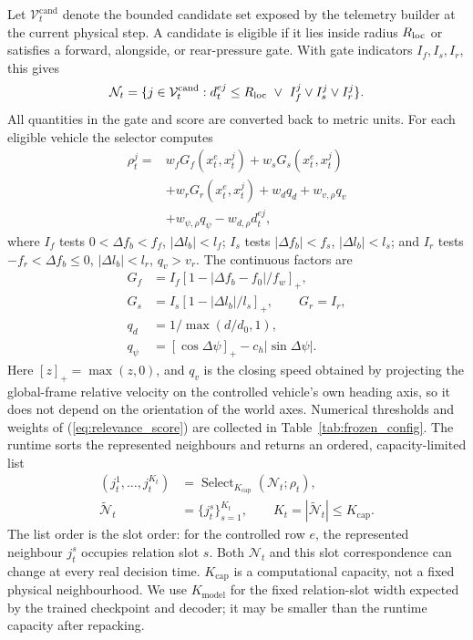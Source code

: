 \documentclass[journal]{IEEEtran}
\begin{document}
Let $\mathcal V_t^{\mathrm{cand}}$ denote the bounded candidate set exposed by
the telemetry builder at the current physical step. A candidate is eligible
if it lies inside radius $R_{\rm loc}$ or satisfies a forward, alongside, or
rear-pressure gate. With gate indicators $I_f,I_s,I_r$, this gives
\begin{equation}
\mathcal N_t=\{j\in\mathcal V_t^{\rm cand}:d_t^{ej}\le R_{\rm loc}
\ \vee\ I_f^j\vee I_s^j\vee I_r^j\}.
\end{equation}
All quantities in the gate and score are converted back to metric units.
For each eligible vehicle the selector computes
\begin{equation}
 \begin{aligned}
 \rho_t^j={}&w_f G_f(x_t^e,x_t^j)+w_s G_s(x_t^e,x_t^j)\\
 &+w_r G_r(x_t^e,x_t^j)+w_d q_d+w_{v,\rho}q_v\\
 &+w_{\psi,\rho}q_\psi-w_{d,\rho}d_t^{ej},
 \end{aligned}
\label{eq:relevance_score}
\end{equation}
where $I_f$ tests $0<\Delta f_b<f_f$, $|\Delta l_b|<l_f$;
$I_s$ tests $|\Delta f_b|<f_s$, $|\Delta l_b|<l_s$; and $I_r$ tests
$-f_r<\Delta f_b\le0$, $|\Delta l_b|<l_r$, $q_v>v_r$.
The continuous factors are
\begin{equation}
\begin{aligned}
G_f&=I_f[1-|\Delta f_b-f_0|/f_w]_+,\\
G_s&=I_s[1-|\Delta l_b|/l_s]_+,\qquad G_r=I_r,\\
q_d&=1/\max(d/d_0,1),\\
q_\psi&=[\cos\Delta\psi]_+-c_h|\sin\Delta\psi|.
\end{aligned}
\end{equation}
Here $[z]_+=\max(z,0)$, and $q_v$ is the closing speed obtained by projecting
the global-frame relative velocity on the controlled vehicle's own heading axis,
so it does not depend on the orientation of the world axes. Numerical
thresholds and weights of (\ref{eq:relevance_score}) are collected in
Table~\ref{tab:frozen_config}. The runtime sorts the
represented neighbours and returns an ordered, capacity-limited list
\begin{equation}
\begin{aligned}
 (j_t^1,\ldots,j_t^{K_t})&=\operatorname{Select}_{K_{\mathrm{cap}}}(\mathcal N_t;\rho_t),\\
 \widetilde{\mathcal N}_t&=\{j_t^s\}_{s=1}^{K_t},\qquad
 K_t=|\widetilde{\mathcal N}_t|\le K_{\mathrm{cap}}.
\end{aligned}
\label{eq:dynamic_selection}
\end{equation}
The list order is the slot order: for the controlled row $e$, the represented
neighbour $j_t^s$ occupies relation slot $s$. Both $\mathcal N_t$ and this
slot correspondence can change at every real decision time. $K_{\mathrm{cap}}$
is a computational capacity, not a fixed physical neighbourhood. We use
$K_{\mathrm{model}}$ for the fixed relation-slot width expected by the trained
checkpoint and decoder; it may be smaller than the runtime capacity after
repacking.
\end{document}

